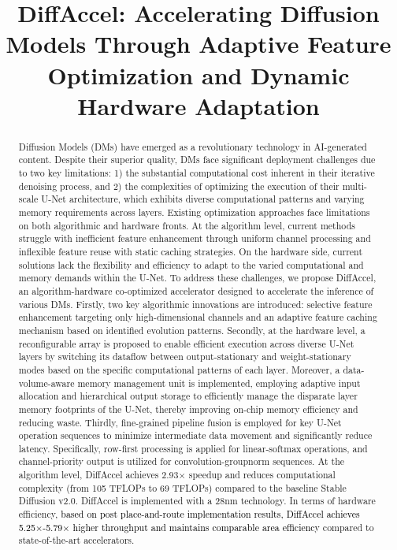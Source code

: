 \title{DiffAccel: Accelerating Diffusion Models Through Adaptive Feature Optimization and Dynamic Hardware Adaptation}

\begin{abstract}
Diffusion Models (DMs) have emerged as a revolutionary technology in AI-generated content. Despite their superior quality, DMs face significant deployment challenges due to two key limitations: 1) the substantial computational cost inherent in their iterative denoising process, and 2) the complexities of optimizing the execution of their multi-scale U-Net architecture, which exhibits diverse computational patterns and varying memory requirements across layers. Existing optimization approaches face limitations on both algorithmic and hardware fronts. At the algorithm level, current methods struggle with inefficient feature enhancement through uniform channel processing and inflexible feature reuse with static caching strategies. On the hardware side, current solutions lack the flexibility and efficiency to adapt to the varied computational and memory demands within the U-Net. To address these challenges, we propose DiffAccel, an algorithm-hardware co-optimized accelerator designed to accelerate the inference of various DMs. Firstly, two key algorithmic innovations are introduced: selective feature enhancement targeting only high-dimensional channels and an adaptive feature caching mechanism based on identified evolution patterns. Secondly, at the hardware level, a reconfigurable array is proposed to enable efficient execution across diverse U-Net layers by switching its dataflow between output-stationary and weight-stationary modes based on the specific computational patterns of each layer. Moreover, a data-volume-aware memory management unit is implemented, employing adaptive input allocation and hierarchical output storage to efficiently manage the disparate layer memory footprints of the U-Net, thereby improving on-chip memory efficiency and reducing waste. Thirdly, fine-grained pipeline fusion is employed for key U-Net operation sequences to minimize intermediate data movement and significantly reduce latency. Specifically, row-first processing is applied for linear-softmax operations, and channel-priority output is utilized for convolution-groupnorm sequences. At the algorithm level, DiffAccel achieves 2.93$\times$ speedup and reduces computational complexity (from 105 TFLOPs to 69 TFLOPs) compared to the baseline Stable Diffusion v2.0. DiffAccel is implemented with a 28nm technology. In terms of hardware efficiency, 
\textcolor{black}{based on post place-and-route implementation results, DiffAccel achieves 5.25$\times$-5.79$\times$ higher throughput and maintains comparable area efficiency} 
compared to state-of-the-art accelerators.
\end{abstract}

